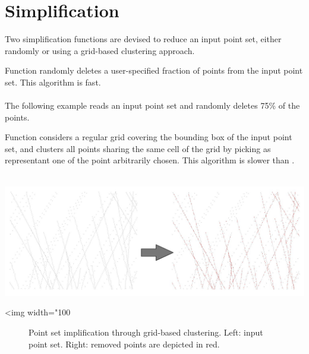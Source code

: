 \section{Simplification}

Two simplification functions are devised to reduce an input point set, either randomly or using a grid-based clustering approach.

Function  randomly deletes a user-specified fraction of points from the input point set. This algorithm is fast. \\
  \\

The following example reads an input point set and randomly deletes 75\% of the points.

Function  considers a regular grid covering the bounding box of the input point set, and clusters all points sharing the same cell of the grid by picking as representant one of the point arbitrarily chosen. This algorithm is slower than . \\
  \\

\begin{center}
    \label{Point_set_processing_3-fig-merge_simplification}
    \begin{ccTexOnly}
        \includegraphics[width=1.0\textwidth]{Point_set_processing_3/merge_simplification} %
    \end{ccTexOnly}
    \begin{ccHtmlOnly}
        <img width="100%
    \end{ccHtmlOnly}
    \begin{figure}[h]
        \caption{Point set implification through grid-based clustering.
                 Left: input point set.
                 Right: removed points are depicted in red.}
    \end{figure}
\end{center}



